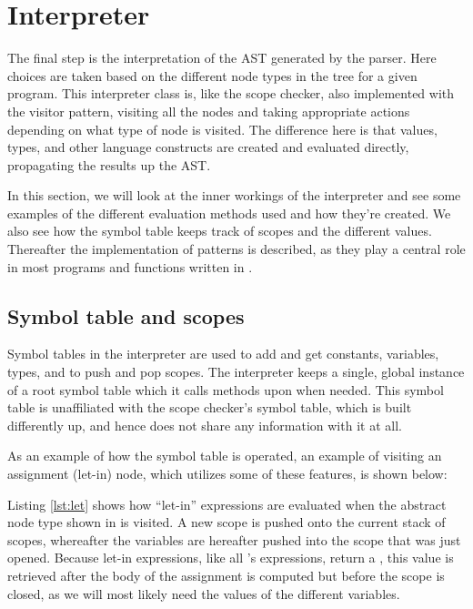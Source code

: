 \section{Interpreter}
The final step is the interpretation of the AST generated by the parser.
Here choices are taken based on the different node types in the tree
for a given program. This interpreter class is, like the scope checker,
also implemented with the visitor pattern, visiting all the nodes and
taking appropriate actions depending on what type of node is visited.
The difference here is that values, types, and other language constructs
are created and evaluated directly, propagating the results up the AST.

In this section, we will look at the inner workings of the interpreter
and see some examples of the different evaluation methods used and how
they're created. We also see how the symbol table keeps track of scopes
and the different values. Thereafter the implementation of patterns is
described, as they play a central role in most programs and functions
written in \productname{}.


\subsection{Symbol table and scopes}
Symbol tables in the interpreter are used to add and get constants,
variables, types, and to push and pop scopes. The interpreter keeps a
single, global instance of a root symbol table which it calls methods
upon when needed. This symbol table is unaffiliated with the scope
checker's symbol table, which is built differently up, and hence does
not share any information with it at all.

As an example of how the symbol table is operated, an example of
visiting an assignment (let-in) node, which utilizes some of these
features, is shown below:



Listing \ref{lst:let} shows how ``let-in'' expressions are evaluated
when the abstract node type shown in  is
visited. A new scope is pushed onto the current stack of scopes,
whereafter the variables are hereafter pushed into the scope that was
just opened. Because let-in expressions, like all \productname{}'s
expressions, return a , this value is retrieved after
the body of the assignment is computed but before the scope is closed,
as we will most likely need the values of the different variables.

